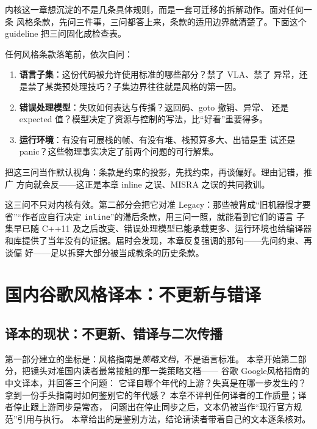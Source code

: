 \documentclass[12pt,a4paper,fontset=fandol]{ctexbook}
\newcommand{\cpp}[1]{C++#1}
\newcommand{\Tp}[1]{\texttt{#1}}
\newcommand{\Lang}[1]{\textsf{#1}}
\newcommand{\DomGo}{\Lang{Google}}
\newcommand{\DomTra}{\Lang{Legacy}}
\begin{document}
内核这一章想沉淀的不是几条具体规则，而是一套可迁移的拆解动作。面对任何一条
风格条款，先问三件事，三问都答上来，条款的适用边界就清楚了。下面这个 guideline
把三问固化成检查表。

\begin{guideline}[title={三问：语言子集、错误处理模型、运行环境}]
任何风格条款落笔前，依次自问：
\begin{enumerate}
  \item \textbf{语言子集}：这份代码被允许使用标准的哪些部分？禁了 VLA、禁了
        异常，还是禁了某类预处理技巧？子集边界往往就是风格的第一因。
  \item \textbf{错误处理模型}：失败如何表达与传播？返回码、goto 撤销、异常、
        还是 expected 值？模型决定了资源与控制的写法，比``好看''重要得多。
  \item \textbf{运行环境}：有没有可展栈的帧、有没有堆、栈预算多大、出错是重
        试还是 panic？这些物理事实决定了前两个问题的可行解集。
\end{enumerate}
把这三问当作默认视角：条款是约束的投影，先找约束，再谈偏好。理由记错，推广
方向就会反——这正是本章 inline 之误、MISRA 之误的共同教训。
\end{guideline}

这三问不只对内核有效。第二部分会把它对准 \DomTra：那些被背成``旧机器慢才要
省''``作者应自行决定 \Tp{inline}''的滞后条款，用三问一照，就能看到它们的语言
子集早已随 \cpp{11} 及之后改变、错误处理模型已能承载更多、运行环境也给编译器
和库提供了当年没有的证据。届时会发现，本章反复强调的那句——先问约束、再谈偏
好——足以拆穿大部分被当成教条的历史条款。


\part{国内谷歌风格译本：不更新与错译}

\chapter{译本的现状：不更新、错译与二次传播}
\label{ch:ch07-version}

第一部分建立的坐标是：风格指南是\emph{策略文档}，不是语言标准。
本章开始第二部分，把镜头对准国内读者最常接触的那一类策略文档——
谷歌 \DomGo 风格指南的中文译本，并回答三个问题：
它译自哪个年代的上游？失真是在哪一步发生的？拿到一份手头指南时如何鉴别它的年代感？
本章不评判任何译者的工作质量；译者停止跟上游同步是常态，
问题出在停止同步之后，文本仍被当作``现行官方规范''引用与执行。
本章给出的是鉴别方法，结论请读者带着自己的文本逐条核对。
\end{document}
